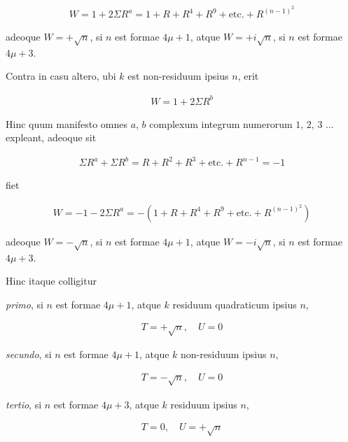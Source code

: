 %
\[
\begin{aligned}
W=1+2\Sigma R^a=1+R+R^4+R^9+\text{etc.}+R^{(n-1)^2}
\end{aligned}
\]

adeoque $W=+\surd n$, si $n$ est formae $4\mu+1$, atque $W=+i\surd n$, si $n$ est formae $4\mu+3$.

Contra in casu altero, ubi $k$ est non-residuum ipsius $n$, erit

\[
\begin{aligned}
W=1+2\Sigma R^b
\end{aligned}
\]

Hinc quum manifesto omnes $a$, $b$ complexum integrum numerorum $1$, $2$, $3$ $\ldots$ expleant, adeoque sit

\[
\begin{aligned}
\Sigma R^a+\Sigma R^b=R+R^2+R^3+\text{etc.}+R^{n-1}=-1
\end{aligned}
\]

fiet

\[
\begin{aligned}
W=-1-2\Sigma R^a=-(1+R+R^4+R^9+\text{etc.}+R^{(n-1)^2})
\end{aligned}
\]

adeoque $W=-\surd n$, si $n$ est formae $4\mu+1$, atque $W=-i\surd n$, si $n$ est formae $4\mu+3$.

Hinc itaque colligitur

\emph{primo}, si $n$ est formae $4\mu+1$, atque $k$ residuum quadraticum ipsius $n$,

\[
\begin{aligned}
T=+\surd n,\quad U=0
\end{aligned}
\]

\emph{secundo}, si $n$ est formae $4\mu+1$, atque $k$ non-residuum ipsius $n$,

\[
\begin{aligned}
T=-\surd n,\quad U=0
\end{aligned}
\]

\emph{tertio}, si $n$ est formae $4\mu+3$, atque $k$ residuum ipsius $n$,

\[
\begin{aligned}
T=0,\quad U=+\surd n
\end{aligned}
\]

